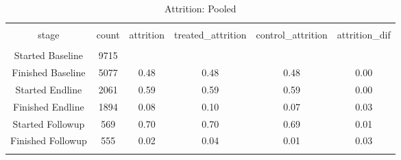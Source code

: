 
\begin{table}[H] \centering 
  \caption{Attrition: Pooled} 
  \label{tbl:Attrition: Pooled} 
\begin{tabular}{@{\extracolsep{5pt}} cccccc} 
\\[-1.8ex]\hline 
\hline \\[-1.8ex] 
stage & count & attrition & treated\_attrition & control\_attrition & attrition\_dif \\ 
\hline \\[-1.8ex] 
Started Baseline & 9715 &  &  &  &  \\ 
Finished Baseline & 5077 & 0.48 & 0.48 & 0.48 & 0.00 \\ 
Started Endline & 2061 & 0.59 & 0.59 & 0.59 & 0.00 \\ 
Finished Endline & 1894 & 0.08 & 0.10 & 0.07 & 0.03 \\ 
Started Followup &  569 & 0.70 & 0.70 & 0.69 & 0.01 \\ 
Finished Followup &  555 & 0.02 & 0.04 & 0.01 & 0.03 \\ 
\hline \\[-1.8ex] 
\end{tabular} 
\end{table} 
